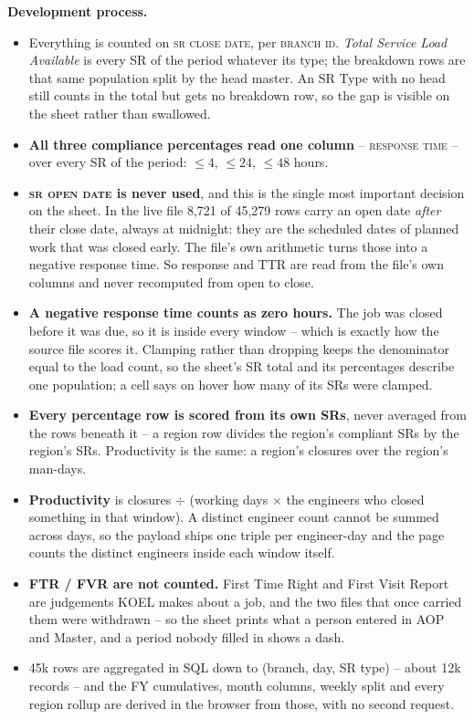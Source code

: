 \documentclass[11pt,a4paper]{article}
\newcommand{\devproc}{\textbf{Development process.}\par}
\newcommand{\col}[1]{\textsc{\small #1}}
\begin{document}
\devproc
\begin{itemize}
  \item Everything is counted on \col{sr close date}, per \col{branch id}. \emph{Total
  Service Load Available} is every SR of the period whatever its type; the breakdown rows
  are that same population split by the head master. An SR Type with no head still counts
  in the total but gets no breakdown row, so the gap is visible on the sheet rather than
  swallowed.
  \item \textbf{All three compliance percentages read one column} -- \col{response time} --
  over every SR of the period: $\le 4$, $\le 24$, $\le 48$ hours.
  \item \textbf{\col{sr open date} is never used}, and this is the single most important
  decision on the sheet. In the live file 8,721 of 45,279 rows carry an open date
  \emph{after} their close date, always at midnight: they are the scheduled dates of
  planned work that was closed early. The file's own arithmetic turns those into a
  negative response time. So response and TTR are read from the file's own columns and
  never recomputed from open to close.
  \item \textbf{A negative response time counts as zero hours.} The job was closed before
  it was due, so it is inside every window -- which is exactly how the source file scores
  it. Clamping rather than dropping keeps the denominator equal to the load count, so the
  sheet's SR total and its percentages describe one population; a cell says on hover how
  many of its SRs were clamped.
  \item \textbf{Every percentage row is scored from its own SRs}, never averaged from the
  rows beneath it -- a region row divides the region's compliant SRs by the region's SRs.
  Productivity is the same: a region's closures over the region's man-days.
  \item \textbf{Productivity} is closures $\div$ (working days $\times$ the engineers who
  closed something in that window). A distinct engineer count cannot be summed across
  days, so the payload ships one triple per engineer-day and the page counts the distinct
  engineers inside each window itself.
  \item \textbf{FTR / FVR are not counted.} First Time Right and First Visit Report are
  judgements KOEL makes about a job, and the two files that once carried them were
  withdrawn -- so the sheet prints what a person entered in AOP and Master, and a period
  nobody filled in shows a dash.
  \item 45k rows are aggregated in SQL down to (branch, day, SR type) -- about 12k records
  -- and the FY cumulatives, month columns, weekly split and every region rollup are
  derived in the browser from those, with no second request.
\end{itemize}
\end{document}
